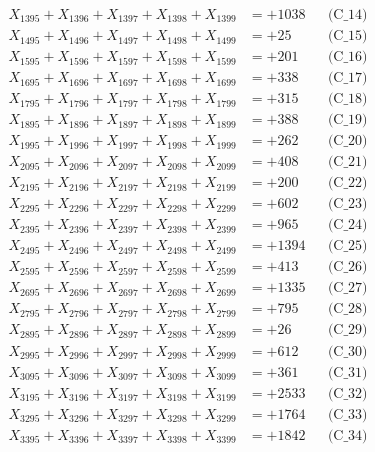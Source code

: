 \documentclass[a4paper,10pt]{article}
\begin{document}
{\begin{align}
X_{1395} + X_{1396} + X_{1397} + X_{1398} + X_{1399} &= +1038 && \text{(C\_14)} \\
X_{1495} + X_{1496} + X_{1497} + X_{1498} + X_{1499} &= +25 && \text{(C\_15)} \\
\allowbreak
X_{1595} + X_{1596} + X_{1597} + X_{1598} + X_{1599} &= +201 && \text{(C\_16)} \\
X_{1695} + X_{1696} + X_{1697} + X_{1698} + X_{1699} &= +338 && \text{(C\_17)} \\
X_{1795} + X_{1796} + X_{1797} + X_{1798} + X_{1799} &= +315 && \text{(C\_18)} \\
X_{1895} + X_{1896} + X_{1897} + X_{1898} + X_{1899} &= +388 && \text{(C\_19)} \\
X_{1995} + X_{1996} + X_{1997} + X_{1998} + X_{1999} &= +262 && \text{(C\_20)} \\
\allowbreak
X_{2095} + X_{2096} + X_{2097} + X_{2098} + X_{2099} &= +408 && \text{(C\_21)} \\
X_{2195} + X_{2196} + X_{2197} + X_{2198} + X_{2199} &= +200 && \text{(C\_22)} \\
X_{2295} + X_{2296} + X_{2297} + X_{2298} + X_{2299} &= +602 && \text{(C\_23)} \\
X_{2395} + X_{2396} + X_{2397} + X_{2398} + X_{2399} &= +965 && \text{(C\_24)} \\
X_{2495} + X_{2496} + X_{2497} + X_{2498} + X_{2499} &= +1394 && \text{(C\_25)} \\
\allowbreak
X_{2595} + X_{2596} + X_{2597} + X_{2598} + X_{2599} &= +413 && \text{(C\_26)} \\
X_{2695} + X_{2696} + X_{2697} + X_{2698} + X_{2699} &= +1335 && \text{(C\_27)} \\
X_{2795} + X_{2796} + X_{2797} + X_{2798} + X_{2799} &= +795 && \text{(C\_28)} \\
X_{2895} + X_{2896} + X_{2897} + X_{2898} + X_{2899} &= +26 && \text{(C\_29)} \\
X_{2995} + X_{2996} + X_{2997} + X_{2998} + X_{2999} &= +612 && \text{(C\_30)} \\
\allowbreak
X_{3095} + X_{3096} + X_{3097} + X_{3098} + X_{3099} &= +361 && \text{(C\_31)} \\
X_{3195} + X_{3196} + X_{3197} + X_{3198} + X_{3199} &= +2533 && \text{(C\_32)} \\
X_{3295} + X_{3296} + X_{3297} + X_{3298} + X_{3299} &= +1764 && \text{(C\_33)} \\
X_{3395} + X_{3396} + X_{3397} + X_{3398} + X_{3399} &= +1842 && \text{(C\_34)} \\

\end{align}}
\end{document}
